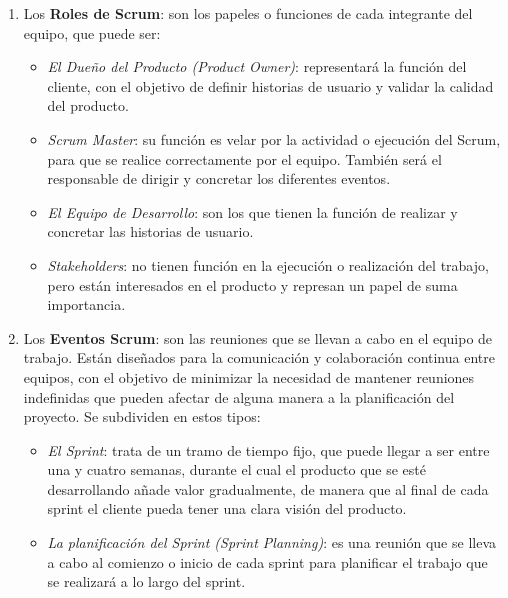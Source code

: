 \begin{enumerate}

    \item
    Los \textbf{Roles de Scrum}: son los papeles o funciones de cada integrante del equipo, que puede ser:
    
        \begin{itemize}
            \item
            \textit{El Dueño del Producto (Product Owner)}: representará la función del cliente, con el objetivo de definir historias de usuario y validar la calidad del producto.
    
            \item
            \textit{Scrum Master}: su función es velar por la actividad o ejecución del Scrum, para que se realice correctamente por el equipo. También será el responsable de dirigir y concretar los diferentes eventos.
    
            \item
            \textit{El Equipo de Desarrollo}: son los que tienen la función de realizar y concretar las historias de usuario.
    
            \item
            \textit{Stakeholders}: no tienen función en la ejecución o realización del trabajo, pero están interesados en el producto y represan un papel de suma importancia.
    
        \end{itemize}

    \item
    Los \textbf{Eventos Scrum}: son las reuniones que se llevan a cabo en el equipo de trabajo. Están diseñados para la comunicación y colaboración continua entre equipos, con el objetivo de minimizar la necesidad de mantener reuniones indefinidas que pueden afectar de alguna manera a la planificación del proyecto. Se subdividen en estos tipos:

        \begin{itemize}
            \item
            \textit{El Sprint}: trata de un tramo de tiempo fijo, que puede llegar a ser entre una y cuatro semanas, durante el cual el producto que se esté desarrollando añade valor gradualmente, de manera que al final de cada sprint el cliente pueda tener una clara visión del producto.
    
            \item
            \textit{La planificación del Sprint (Sprint Planning)}: es una reunión que se lleva a cabo al comienzo o inicio de cada sprint para planificar el trabajo que se realizará a lo largo del sprint.
    

\end{itemize}
\end{enumerate}

